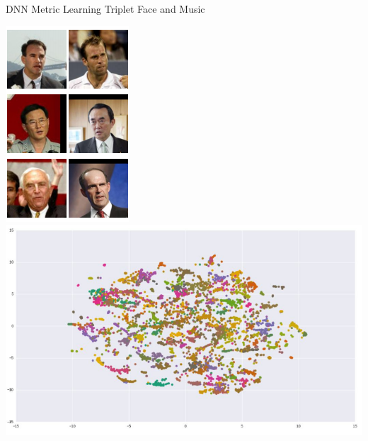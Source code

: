 \documentclass{beamer}
\begin{document}
\begin{frame}{DNN Metric Learning Triplet Face and Music}
		 \begin{center}
		 	\includegraphics[scale=0.5]{img/face1} \includegraphics[scale=0.3]{img/music}
		 \end{center}
\end{frame}
\end{document}
